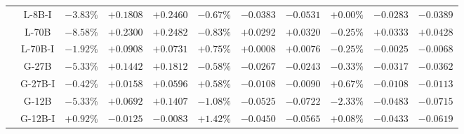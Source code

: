 {\begin{longtable}{|c|c|ccc|ccc|ccc|}
\cline{2-11}
 & L-8B-I & $-3.83\%$ & $+0.1808$ & $+0.2460$ & $-0.67\%$ & $-0.0383$ & $-0.0531$ & $+0.00\%$ & $-0.0283$ & $-0.0389$ \\
\cline{2-11}
 & L-70B & $-8.58\%$ & $+0.2300$ & $+0.2482$ & $-0.83\%$ & $+0.0292$ & $+0.0320$ & $-0.25\%$ & $+0.0333$ & $+0.0428$ \\
\cline{2-11}
 & L-70B-I & $-1.92\%$ & $+0.0908$ & $+0.0731$ & $+0.75\%$ & $+0.0008$ & $+0.0076$ & $-0.25\%$ & $-0.0025$ & $-0.0068$ \\
\cline{2-11}
 & G-27B & $-5.33\%$ & $+0.1442$ & $+0.1812$ & $-0.58\%$ & $-0.0267$ & $-0.0243$ & $-0.33\%$ & $-0.0317$ & $-0.0362$ \\
\cline{2-11}
 & G-27B-I & $-0.42\%$ & $+0.0158$ & $+0.0596$ & $+0.58\%$ & $-0.0108$ & $-0.0090$ & $+0.67\%$ & $-0.0108$ & $-0.0113$ \\
\cline{2-11}
 & G-12B & $-5.33\%$ & $+0.0692$ & $+0.1407$ & $-1.08\%$ & $-0.0525$ & $-0.0722$ & $-2.33\%$ & $-0.0483$ & $-0.0715$ \\
\cline{2-11}
 & G-12B-I & $+0.92\%$ & $-0.0125$ & $-0.0083$ & $+1.42\%$ & $-0.0450$ & $-0.0565$ & $+0.08\%$ & $-0.0433$ & $-0.0619$ \\
\hline
\end{longtable}
}